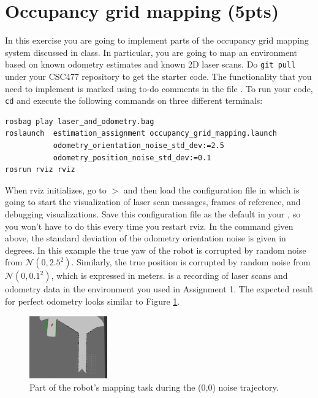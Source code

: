 \documentclass[11pt, a4paper]{article}
\begin{document}
\section{Occupancy grid mapping (5pts)}
In this exercise you are going to implement parts of the occupancy grid mapping system discussed in class. In particular, you are going to map an environment
based on known odometry estimates and known 2D laser scans. Do \texttt{git pull} under your CSC477 repository to get the starter code. The functionality
that you need to implement is marked using to-do comments in the file . To run your code,
\texttt{cd}  and execute the following commands on three different terminals:
\begin{verbatim}
rosbag play laser_and_odometry.bag
roslaunch  estimation_assignment occupancy_grid_mapping.launch                   
           odometry_orientation_noise_std_dev:=2.5 
           odometry_position_noise_std_dev:=0.1
rosrun rviz rviz    
\end{verbatim}
\quad
\newline
\noindent When rviz initializes, go to  $>$  and then load the configuration file in 
which is going to start the visualization of laser scan messages, frames of reference, and debugging visualizations. Save this configuration file as the default
in your , so you won't have to do this every time you restart rviz. In the  command given above, the standard deviation of the odometry orientation noise is given in degrees. In this example the true yaw of the robot is corrupted by random noise from $\mathcal{N}(0, 2.5^2)$. Similarly, the true position is corrupted by random noise from $\mathcal{N}(0, 0.1^2)$, which is expressed in meters.  is a recording of laser scans and odometry data in the environment you used in Assignment 1. The expected result for perfect odometry looks similar to Figure \ref{fig:gmapping}.
\newline
\begin{figure}[h!]
  \begin{center}
    \includegraphics[width=0.3\textwidth]{gmapping}
  \end{center}
  \caption{Part of the robot's mapping task during the (0,0) noise trajectory.}
  \label{fig:gmapping}
\end{figure}
\end{document}
